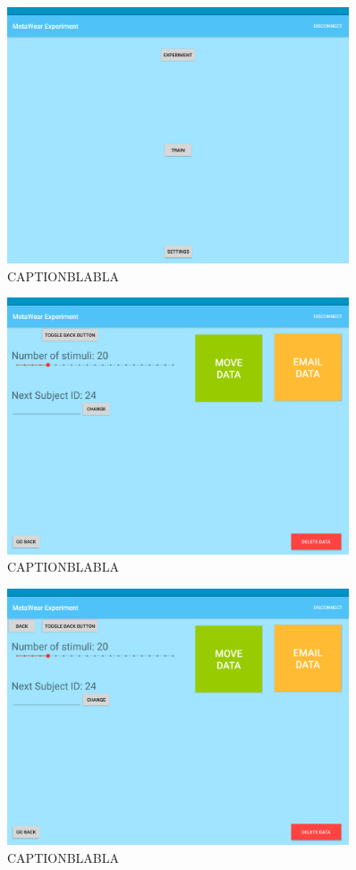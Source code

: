 \begin{figure}[h!]
\centering
\includegraphics[width=0.9\textwidth]{figures/tablet_screen0.png}
\caption{CAPTIONBLABLA}
\label{appendix_app_screen_0}
\end{figure}

\begin{figure}[h!]
\centering
\includegraphics[width=0.9\textwidth]{figures/tablet_screen1.png}
\caption{CAPTIONBLABLA}
\label{appendix_app_screen_1}
\end{figure}

\begin{figure}[h!]
\centering
\includegraphics[width=0.9\textwidth]{figures/tablet_screen2.png}
\caption{CAPTIONBLABLA}
\label{appendix_app_screen_2}
\end{figure}


